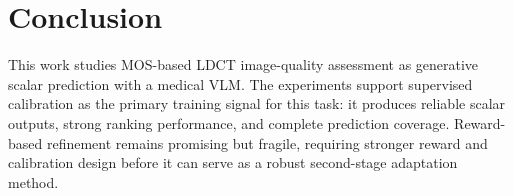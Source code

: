 \chapter{Conclusion}
This work studies MOS-based LDCT image-quality assessment as generative scalar prediction with a medical VLM. The experiments support supervised calibration as the primary training signal for this task: it produces reliable scalar outputs, strong ranking performance, and complete prediction coverage. Reward-based refinement remains promising but fragile, requiring stronger reward and calibration design before it can serve as a robust second-stage adaptation method.
